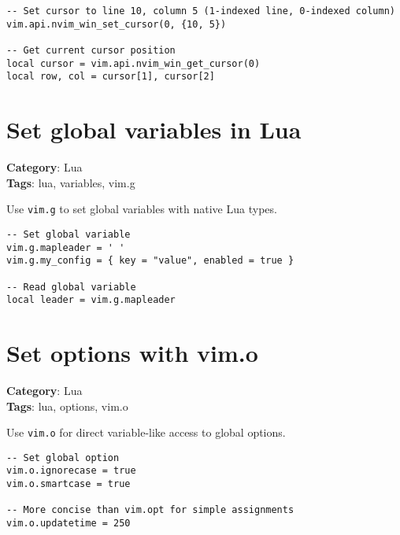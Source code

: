 {{{{{{{\begin{Exa*}{}
\begin{Verbatim}[fontsize=\footnotesize, breaklines, breakanywhere]
-- Set cursor to line 10, column 5 (1-indexed line, 0-indexed column)
vim.api.nvim_win_set_cursor(0, {10, 5})

-- Get current cursor position
local cursor = vim.api.nvim_win_get_cursor(0)
local row, col = cursor[1], cursor[2]
\end{Verbatim}
\end{Exa*}

\section{Set global variables in Lua}

\textbf{Category}: Lua\\ \textbf{Tags}: lua, variables, vim.g
\vspace{0.5cm}

Use {\footnotesize \Verb§vim.g§} to set global variables with native Lua types.

\begin{Exa*}{}
\begin{Verbatim}[fontsize=\footnotesize, breaklines, breakanywhere]
-- Set global variable
vim.g.mapleader = ' '
vim.g.my_config = { key = "value", enabled = true }

-- Read global variable
local leader = vim.g.mapleader
\end{Verbatim}
\end{Exa*}

\section{Set options with vim.o}

\textbf{Category}: Lua\\ \textbf{Tags}: lua, options, vim.o
\vspace{0.5cm}

Use {\footnotesize \Verb§vim.o§} for direct variable-like access to global options.

\begin{Exa*}{}
\begin{Verbatim}[fontsize=\footnotesize, breaklines, breakanywhere]
-- Set global option
vim.o.ignorecase = true
vim.o.smartcase = true

-- More concise than vim.opt for simple assignments
vim.o.updatetime = 250
\end{Verbatim}
\end{Exa*}

}}}}}}}
